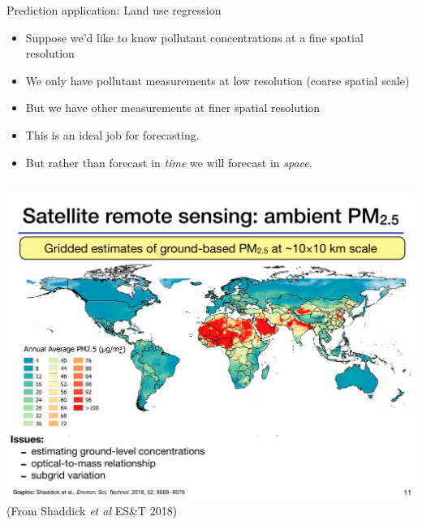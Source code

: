 \documentclass[aspectratio=169]{beamer}
\begin{document}
\begin{frame}{Prediction application: Land use regression}
  \begin{itemize}
    \item Suppose we'd like to know pollutant concentrations at a fine spatial resolution
    \item We only have pollutant measurements at low resolution (coarse spatial scale)
    \item But we have other measurements at finer spatial resolution
    \item This is an ideal job for forecasting.  
    \item But rather than forecast in \textit{time} we will forecast in \textit{space}.
  \end{itemize}

\begin{columns}
\includegraphics[width = \textwidth]{pm2_5_LUR_Shaddick.pdf}
(From Shaddick \textit{et al} ES\&T 2018)
\end{columns}
\end{frame}
\end{document}
